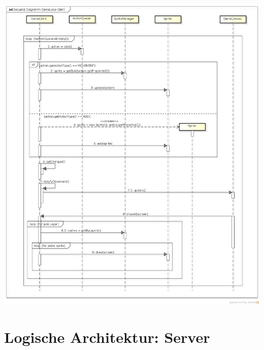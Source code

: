 \documentclass[11pt]{scrartcl}
\begin{document}
\includegraphics[scale=0.39]{SequenzDiagrammGameLoopClient}
\section{Logische Architektur: Server}
\end{document}

